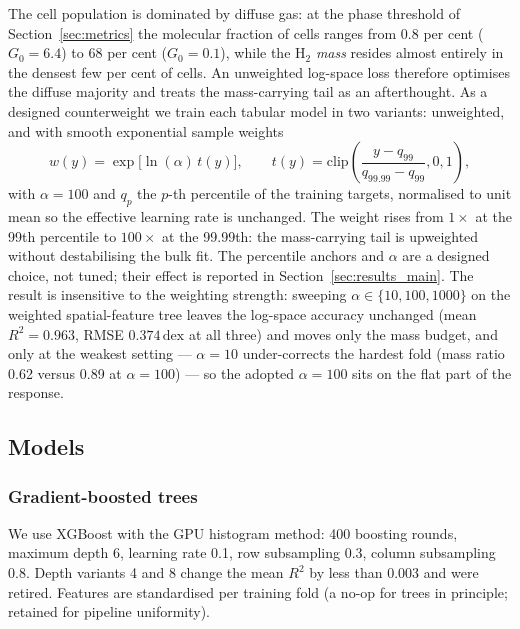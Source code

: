 \documentclass[fleqn,usenatbib]{rasti}
\newcommand{\Gzero}{G_0}
\newcommand{\dex}{\,\text{dex}}
\newcommand{\Rsq}{R^2}
\begin{document}
The cell population is dominated by diffuse gas: at the phase threshold
of Section~\ref{sec:metrics} the molecular fraction of cells ranges from
0.8 per cent (\(\Gzero = 6.4\)) to 68 per cent (\(\Gzero = 0.1\)), while the
H\(_2\) \emph{mass} resides almost entirely in the densest few per cent of
cells. An unweighted log-space loss therefore optimises the diffuse
majority and treats the mass-carrying tail as an afterthought. As a
designed counterweight we train each tabular model in two variants:
unweighted, and with smooth exponential sample weights
\begin{equation}
  w(y) = \exp\!\big[\ln(\alpha)\, t(y)\big], \qquad
  t(y) = \mathrm{clip}\!\left(
     \frac{y - q_{99}}{q_{99.99} - q_{99}}, 0, 1\right),
  \label{eq:weights}
\end{equation}
with \(\alpha = 100\) and \(q_p\) the \(p\)-th percentile of the training
targets, normalised to unit mean so the effective learning rate is
unchanged. The weight rises from \(1\times\) at the 99th percentile to
\(100\times\) at the 99.99th: the mass-carrying tail is upweighted without
destabilising the bulk fit. The percentile anchors and \(\alpha\) are a
designed choice, not tuned; their effect is reported in
Section~\ref{sec:results_main}. The result is insensitive to the
weighting strength: sweeping \(\alpha \in \{10, 100, 1000\}\) on the
weighted spatial-feature tree leaves the log-space accuracy unchanged
(mean \(\Rsq = 0.963\), RMSE \(0.374\dex\) at all three) and moves only
the mass budget, and only at the weakest setting --- \(\alpha = 10\)
under-corrects the hardest fold (mass ratio 0.62 versus 0.89 at
\(\alpha = 100\)) --- so the adopted \(\alpha = 100\) sits on the flat
part of the response.

\subsection{Models}
\label{sec:models}

\subsubsection{Gradient-boosted trees}
We use XGBoost \citep{Chen2016} with the GPU histogram method: 400
boosting rounds, maximum depth 6, learning rate 0.1, row subsampling
0.3, column subsampling 0.8. Depth variants 4 and 8 change the mean
\(\Rsq\) by less than 0.003 and were retired. Features are standardised
per training fold (a no-op for trees in principle; retained for pipeline
uniformity).
\end{document}

